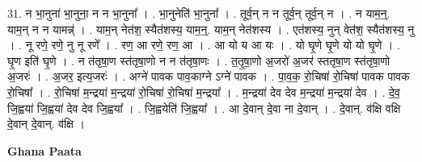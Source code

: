 \documentclass[17pt]{extarticle}
\begin{document}
31. न भा॒नुना॑ भा॒नुना॒ न न भा॒नुना᳚ । . भा॒नुनेति॑ भा॒नुना᳚ । . तूर्व॒न् न न तूर्व॒न् तूर्व॒न् न । . न याम॒न्॒. याम॒न् न न यामन्न्॑ । . याम॒न् नेत॑श॒ स्यैत॑शस्य॒ याम॒न्॒. याम॒न् नेत॑शस्य । . एत॑शस्य॒ नुन् वेत॑श॒ स्यैत॑शस्य॒ नु । . नू रणे॒ रणे॒ नु नू रणे᳚ । . रण॒ आ रणे॒ रण॒ आ । . आ यो य आ यः । . यो घृ॒णे घृ॒णे यो यो घृ॒णे । . घृ॒ण इति॑ घृ॒णे । . न त॑तृषा॒ण स्त॑तृषा॒णो न न त॑तृषा॒णः । . त॒तृ॒षा॒णो अ॒जरो॑ अ॒जर॑ स्ततृषा॒ण स्त॑तृषा॒णो अ॒जरः॑ । . अ॒जर॒ इत्य॒जरः॑ । . अग्ने॑ पावक पाव॒काग्ने ऽग्ने॑ पावक । . पा॒व॒क॒ रो॒चिषा॑ रो॒चिषा॑ पावक पावक रो॒चिषा᳚ । . रो॒चिषा॑ म॒न्द्रया॑ म॒न्द्रया॑ रो॒चिषा॑ रो॒चिषा॑ म॒न्द्रया᳚ । . म॒न्द्रया॑ देव देव म॒न्द्रया॑ म॒न्द्रया॑ देव । . दे॒व॒ जि॒ह्वया॑ जि॒ह्वया॑ देव देव जि॒ह्वया᳚ । . जि॒ह्वयेति॑ जि॒ह्वया᳚ । . आ दे॒वान् दे॒वा ना दे॒वान् । . दे॒वान्. व॑क्षि वक्षि दे॒वान् दे॒वान्. व॑क्षि । \newline

\textbf{Ghana Paata } \newline
\end{document}
